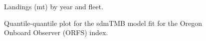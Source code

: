 \documentclass[
]{scrartcl}
\begin{document}
\begin{figure}


\caption{\label{fig-catch}Landings (mt) by year and fleet.}

\end{figure}%

\begin{figure}


\caption{\label{fig-orfs_qqplot}Quantile-quantile plot for the sdmTMB
model fit for the Oregon Onboard Observer (ORFS) index.}

\end{figure}%
\end{document}
